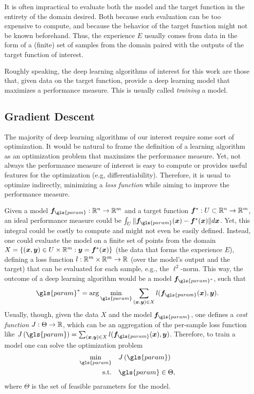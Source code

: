 It is often impractical to evaluate both the model and the target function in the entirety of the domain desired.
Both because such evaluation can be too expensive to compute, and because the behavior of the target function might not be known beforehand.
Thus, the experience $E$ usually comes from data in the form of a (finite) set of samples from the domain paired with the outputs of the target function of interest.

Roughly speaking, the deep learning algorithms of interest for this work are those that, given data on the target function, provide a deep learning model that maximizes a performance measure.
This is usually called \emph{training} a model.

\subsection{Gradient Descent}

The majority of deep learning algorithms of our interest require some sort of optimization.
It would be natural to frame the definition of a learning algorithm as an optimization problem that maximizes the performance measure.
Yet, not always the performance measure of interest is easy to compute or provides useful features for the optimization (e.g, differentiability).
Therefore, it is usual to optimize indirectly, minimizing a \textit{loss function} while aiming to improve the performance measure.

Given a model $\bm{f}_{\gls{param}}:\R^n\to\R^m$ and a target function $\bm{f}^*:U\subset\mathbb{R}^n\to\mathbb{R}^m$, an ideal performance measure could be $\int_U \|\bm{f}_{\gls{param}}(\bm{x}) - \bm{f}^*(\bm{x})\|d\bm{x}$.
Yet, this integral could be costly to compute and might not even be easily defined.
Instead, one could evaluate the model on a finite set of points from the domain $X=\{(\bm{x},\bm{y})\in U\times\mathbb{R}^m : \bm{y}=\bm{f}^*(\bm{x})\}$ (the data that forms the experience $E$), defining a loss function $l:\mathbb{R}^m\times\mathbb{R}^m\to\mathbb{R}$ (over the model's output and the target) that can be evaluated for each sample, e.g., the $\ell^2$-norm.
This way, the outcome of a deep learning algorithm would be a model $\bm{f}_{\gls{param}^*}$, such that \[
\gls{param}^* = \arg\min_{\gls{param}} \sum_{(\bm{x},\bm{y})\in X} l(\bm{f}_{\gls{param}}(\bm{x}), \bm{y})
.\] Usually, though, given the data $X$ and the model $\bm{f}_{\gls{param}}$, one defines a \emph{cost function} $J: \Theta\to\mathbb{R}$, which can be an aggregation of the per-sample loss function like $J\left( \gls{param} \right) = \sum_{(\bm{x},\bm{y})\in X} l(\bm{f}_{\gls{param}}(\bm{x}), \bm{y})$.
Therefore, to train a model one can solve the optimization problem
\begin{align*}
    \min_{\gls{param}} \quad & J\left( \gls{param} \right)  \\
    \text{s.t.} \quad & \gls{param} \in \Theta
,\end{align*}
where $\Theta$ is the set of feasible parameters for the model.

